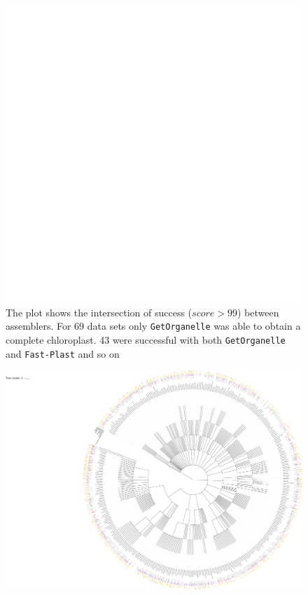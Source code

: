 \documentclass{bmcart}
\newcommand{\formatprogramnames}[1]{\texttt{#1}}
\newcommand{\fp}{\formatprogramnames{Fast-Plast}}
\newcommand{\go}{\formatprogramnames{GetOrganelle}}
\begin{document}
\begin{backmatter}
\begin{figure}[h!]
  \includegraphics[width=\textwidth,page=2]{plots/upset.pdf}
  \caption{
      The plot shows the intersection of success ($score > 99$) between assemblers. For \num{69} data sets only \go{} was able to obtain a complete chloroplast. \num{43} were successful with both \go{} and \fp{} and so on}
            \label{fig:upset}
      \end{figure}

\begin{figure}[h!]
  \includegraphics[width=\textwidth]{plots/real_datasets_tree.pdf}
  \caption{
       }
      \label{fig:tree}
      \end{figure}


\end{backmatter}
\end{document}
